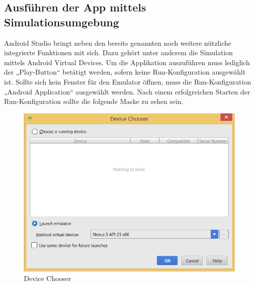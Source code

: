 %
%

\subsection{Ausführen der App mittels Simulationsumgebung}
\label{subsec:Ausführen der App mittels Simulationsumgebung}
Android Studio bringt neben den bereits genannten noch weitere nützliche integrierte Funktionen mit sich. Dazu gehört unter anderem die Simulation mittels Android Virtual Devices.
Um die Applikation auszuführen muss lediglich der „Play-Button“ betätigt werden, sofern keine Run-Konfiguration ausgewählt ist. Sollte sich kein Fenster für den Emulator öffnen, muss die Run-Konfiguration „Android Application“ ausgewählt werden. Nach einem erfolgreichen Starten der Run-Konfiguration sollte die folgende Maske zu sehen sein.

\begin{figure}[H]
	\begin{center}
		\includegraphics[width=1.0\linewidth]{images/device_chooser.png}
		\caption{Device Chooser}
		\label{device_chooser}
	\end{center}
\end{figure}

